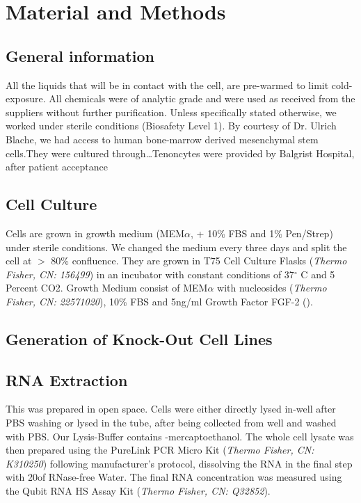 \renewcommand{\package}{\emph}
\newcommand{\product}{\textit}

\chapter{Material and Methods}

\section{General information}
All the liquids that will be in contact with the cell, are pre-warmed to limit cold-exposure. All chemicals were of analytic grade and were used as received from the suppliers without further purification.  Unless specifically stated otherwise, we worked under sterile conditions (Biosafety Level 1). By courtesy of Dr. Ulrich Blache, we had access to human bone-marrow derived mesenchymal stem cells.They were cultured through\ldots Tenoncytes were provided by Balgrist Hospital, after patient acceptance

\section{Cell Culture}

Cells are grown in growth medium  (MEM$\alpha$, + 10\% FBS and 1\% Pen/Strep) under sterile conditions. We changed the medium every three days and split the cell at $>$ 80\% confluence. 
They are grown in T75 Cell Culture Flasks (\product{Thermo Fisher, CN: 156499}) in an incubator with constant conditions of 37$^{\circ}$ C and 5 Percent CO2. Growth Medium consist of MEM$\alpha$ with nucleosides (\product{Thermo Fisher, CN: 22571020}), 10\% FBS and 5ng/ml Growth Factor FGF-2 ().

\section{Generation of Knock-Out Cell Lines}

\section{RNA Extraction}
This was prepared in open space. Cells were either directly lysed in-well after PBS washing or lysed in the tube, after being collected from well and washed with PBS. Our Lysis-Buffer contains \textbeta-mercaptoethanol. The whole cell lysate was then prepared using the PureLink PCR Micro Kit (\product{Thermo Fisher, CN: K310250}) following manufacturer's protocol, dissolving the RNA in the final step with 20\mul of RNase-free Water. The final RNA concentration was measured using the Qubit RNA HS Assay Kit (\product{Thermo Fisher, CN: Q32852}). 

